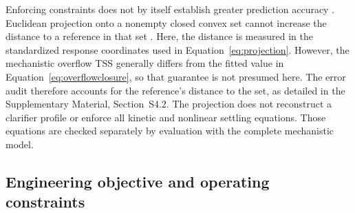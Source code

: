 \documentclass[a4paper,fleqn]{cas-sc}
\begin{document}
Enforcing constraints does not by itself establish greater prediction accuracy \citep{SturmSilva2025}. Euclidean projection onto a nonempty closed convex set cannot increase the distance to a reference in that set \citep{Boyd2004}. Here, the distance is measured in the standardized response coordinates used in Equation~\eqref{eq:projection}. However, the mechanistic overflow TSS generally differs from the fitted value in Equation~\eqref{eq:overflowclosure}, so that guarantee is not presumed here. The error audit therefore accounts for the reference's distance to the set, as detailed in the Supplementary Material, Section~S4.2. The projection does not reconstruct a clarifier profile or enforce all kinetic and nonlinear settling equations. Those equations are checked separately by evaluation with the complete mechanistic model.

\subsection{Engineering objective and operating constraints}
\end{document}
